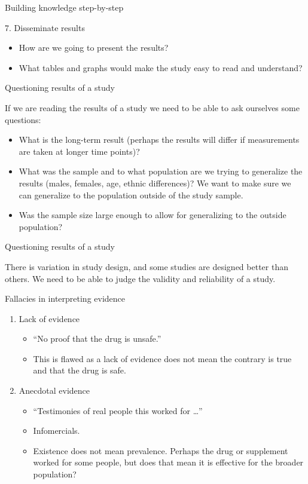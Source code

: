 \documentclass[14pt]{beamer}\usepackage[]{graphicx}\usepackage[]{color}
\begin{document}
\begin{frame}[fragile]{Building knowledge step-by-step}

7. Disseminate results

\begin{itemize}
\item How are we going to present the results?
\item What tables and graphs would make the study easy to read and understand?
\end{itemize}
\end{frame}

\begin{frame}[fragile]{Questioning results of a study}

{\small{
If we are reading the results of a study we need to be able to ask ourselves some questions:

\begin{itemize}
\item What is the long-term result (perhaps the results will differ if measurements are taken at longer time points)?
\item What was the sample and to what population are we trying to generalize the results (males, females, age, ethnic differences)?  We want to make sure we can generalize to the population outside of the study sample.
\item Was the sample size large enough to allow for generalizing to the outside population?
\end{itemize}
}}
\end{frame}

\begin{frame}[fragile]{Questioning results of a study}

There is variation in study design, and some studies are designed better than others.  We need to be able to judge the validity and reliability of a study.
\end{frame}

\begin{frame}[fragile]{Fallacies in interpreting evidence}

\begin{enumerate}
\item Lack of evidence
  \begin{itemize}
  \item ``No proof that the drug is unsafe.''
  \item This is flawed as a lack of evidence does not mean the contrary is true and that the drug is safe.
  \end{itemize}
\item Anecdotal evidence
  \begin{itemize}
  \item ``Testimonies of real people this worked for \dots''
  \item Infomercials.
  \item Existence does not mean prevalence.  Perhaps the drug or supplement worked for some people, but does that mean it is effective for the broader population?
  \end{itemize}
\end{enumerate}
\end{frame}
\end{document}
